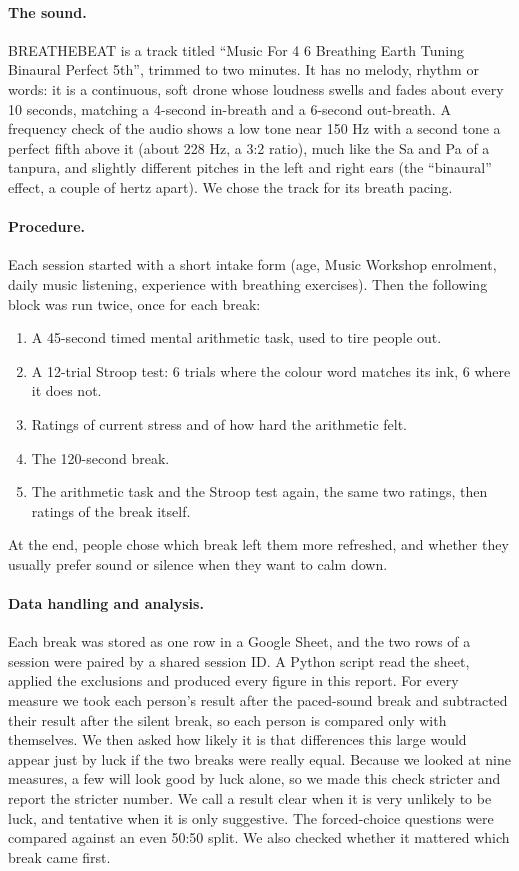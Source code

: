 \documentclass[11pt,a4paper]{article}
\begin{document}
\paragraph{The sound.} BREATHEBEAT is a track titled ``Music For 4 6 Breathing Earth Tuning Binaural Perfect 5th'', trimmed to two minutes. It has no melody, rhythm or words: it is a continuous, soft drone whose loudness swells and fades about every 10 seconds, matching a 4-second in-breath and a 6-second out-breath. A frequency check of the audio shows a low tone near 150 Hz with a second tone a perfect fifth above it (about 228 Hz, a 3:2 ratio), much like the Sa and Pa of a tanpura, and slightly different pitches in the left and right ears (the ``binaural'' effect, a couple of hertz apart). We chose the track for its breath pacing.

\paragraph{Procedure.} Each session started with a short intake form (age, Music Workshop enrolment, daily music listening, experience with breathing exercises). Then the following block was run twice, once for each break:
\begin{enumerate}
\item A 45-second timed mental arithmetic task, used to tire people out.
\item A 12-trial Stroop test: 6 trials where the colour word matches its ink, 6 where it does not.
\item Ratings of current stress and of how hard the arithmetic felt.
\item The 120-second break.
\item The arithmetic task and the Stroop test again, the same two ratings, then ratings of the break itself.
\end{enumerate}
At the end, people chose which break left them more refreshed, and whether they usually prefer sound or silence when they want to calm down.

\paragraph{Data handling and analysis.} Each break was stored as one row in a Google Sheet, and the two rows of a session were paired by a shared session ID. A Python script read the sheet, applied the exclusions and produced every figure in this report. For every measure we took each person's result after the paced-sound break and subtracted their result after the silent break, so each person is compared only with themselves. We then asked how likely it is that differences this large would appear just by luck if the two breaks were really equal. Because we looked at nine measures, a few will look good by luck alone, so we made this check stricter and report the stricter number. We call a result clear when it is very unlikely to be luck, and tentative when it is only suggestive. The forced-choice questions were compared against an even 50:50 split. We also checked whether it mattered which break came first.
\end{document}
